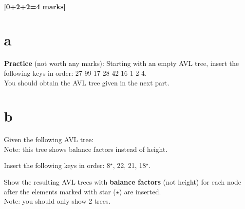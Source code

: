 \documentclass[12pt]{article}
\begin{document}
	
	\subsection{[0+2+2=4 marks]}
	
	\begin{enumerate}
		\part{a} {\bf Practice} (not worth any marks):  Starting with an empty AVL tree, insert the following keys in order: 27 99 17 28 42 16 1 2 4. \\
		
		You should obtain the AVL tree given in the next part.
		
		\part{b} Given the following AVL tree: \\
		Note: this tree shows balance factors instead of height.
		
		\begin{center}
		\end{center}
		
		Insert the following keys in order:  8$^\star$, 22, 21, 18$^\star$.
		
		Show the resulting AVL trees with {\bf balance factors} (not height) for each node after the elements marked with star ($\star$) are inserted. \\
		Note: you should only show 2 trees.
		

\end{enumerate}
\end{document}

